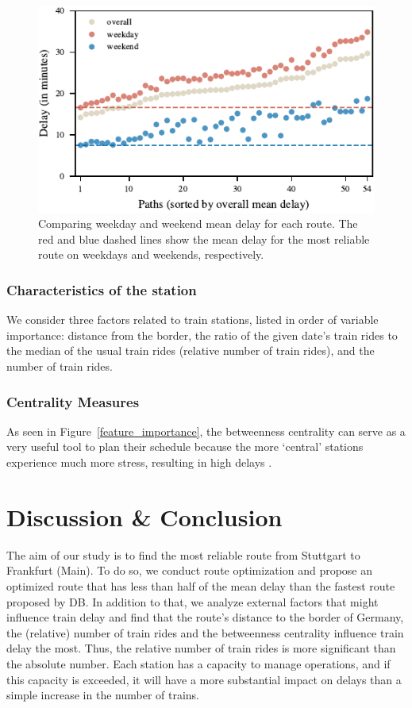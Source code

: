 \documentclass{article}
\theoremstyle{plain}
\theoremstyle{definition}
\theoremstyle{remark}
\begin{document}
	\begin{figure}[h]
		\includegraphics{./fig/plot_FP_03_WeekdayWeekend.pdf}
		\caption{Comparing weekday and weekend mean delay for each route. The red and blue dashed lines show the mean delay for the most reliable route on weekdays and weekends, respectively.}
		\label{we_wd}
	\end{figure}
	
	\subsubsection{Characteristics of the station}
	
	We consider three factors related to train stations, listed in order of variable importance: distance from the border, the ratio of the given date's train rides to the median of the usual train rides (relative number of train rides), and the number of train rides. 
	
	\subsubsection{Centrality Measures}
	
	As seen in Figure~\ref{feature_importance}, the betweenness centrality can serve as a very useful tool to plan their schedule because the more ‘central’ stations experience much more stress, resulting in high delays \cite{centrality}. 
	
	
	\section{Discussion \& Conclusion}\label{sec:conclusion}
	
	The aim of our study is to find the most reliable route from Stuttgart to Frankfurt (Main). To do so, we conduct route optimization and propose an optimized route that has less than half of the mean delay than the fastest route proposed by DB. In addition to that, we analyze external factors that might influence train delay and find that the route's distance to the border of Germany, the (relative) number of train rides and the betweenness centrality influence train delay the most. Thus, the relative number of train rides is more significant than the absolute number. Each station has a capacity to manage operations, and if this capacity is exceeded, it will have a more substantial impact on delays than a simple increase in the number of trains.
	
\end{document}
